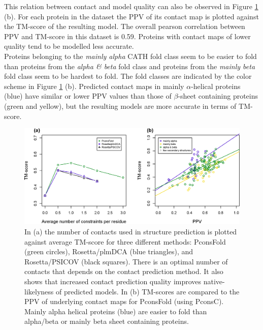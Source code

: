 \documentclass{bioinfo}
\begin{document}
This relation between contact and model quality can also be observed in Figure \ref{fig:main} (b). For each protein in the dataset the PPV of its contact map is plotted against the TM-score of the resulting model. The overall pearson correlation between PPV and TM-score in this dataset is 0.59. Proteins with contact maps of lower quality tend to be modelled less accurate. \\\indent
Proteins belonging to the {\it mainly alpha} CATH fold class seem to be easier to fold than proteins from the {\it alpha \& beta} fold class and proteins from the {\it mainly beta} fold class seem to be hardest to fold. The fold classes are indicated by the color scheme in Figure \ref{fig:main} (b). Predicted contact maps in mainly $\alpha$-helical proteins (blue) have similar or lower PPV values than those of $\beta$-sheet containing proteins (green and yellow), but the resulting models are more accurate in terms of TM-score.
\begin{figure}[!tpb]%
    \centerline{\includegraphics[scale=0.35]{figures/tmscores.eps}}
\caption{In (a) the number of contacts used in structure prediction is plotted against average TM-score for three different methods: PconsFold (green circles), Rosetta/plmDCA (blue triangles), and Rosetta/PSICOV (black squares). There is an optimal number of contacts that depends on the contact prediction method. It also shows that increased contact prediction quality improves native-likelyness of predicted models. In (b) TM-scores are compared to the PPV of underlying contact maps for PconsFold (using PconsC). Mainly alpha helical proteins (blue) are easier to fold than alpha/beta or mainly beta sheet containing proteins.}\label{fig:main}
\end{figure}
\end{document}
